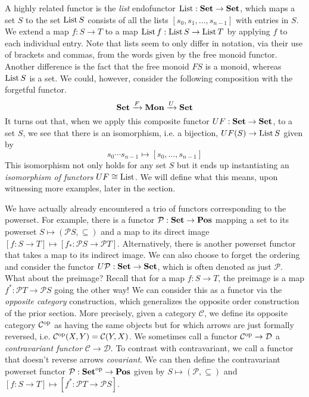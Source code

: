 A highly related functor is the \emph{list} endofunctor $\operatorname{List}:\mathbf{Set}\to\mathbf{Set}$, which maps a set $S$ to the set $\operatorname{List} S $ consists of all the lists $[s_0,s_1,\dots,s_{n-1}]$ with entries in $S$. We extend a map $f:S\to T$ to a map $\operatorname{List} f:\operatorname{List} S\to\operatorname{List} T$ by applying $f$ to each individual entry. Note that lists seem to only differ in notation, via their use of brackets and commas, from the words given by the free monoid functor. Another difference is the fact that the free monoid $FS$ is a monoid, whereas $\operatorname{List} S$ is a set. We could, however, consider the following composition with the forgetful functor.
\[\mathbf{Set}\xrightarrow{F}\mathbf{Mon}\xrightarrow{U}\mathbf{Set}\]
It turns out that, when we apply this composite functor $UF:\mathbf{Set}\to\mathbf{Set}$, to a set $S$, we see that there is an isomorphism, i.e. a bijection, $UF(S)\to\operatorname{List} S$ given by
\[s_0\cdots s_{n-1}\mapsto [s_0,\dots,s_{n-1}]\]
This isomorphism not only holds for any set $S$ but it ends up instantiating an \emph{isomorphism of functors} $UF\cong\operatorname{List}$. We will define what this means, upon witnessing more examples, later in the section.

We have actually already encountered a trio of functors corresponding to the powerset. For example, there is a functor $\mathcal{P}:\mathbf{Set}\to\mathbf{Pos}$ mapping a set to its powerset $S\mapsto(\mathcal{P}S,\subseteq)$ and a map to its direct image $[f:S\to T]\mapsto [f_*:\mathcal{P}S\to\mathcal{P}T]$. Alternatively, there is another powerset functor that takes a map to its indirect image. We can also choose to forget the ordering and consider the functor $U\mathcal{P}:\mathbf{Set}\to\mathbf{Set}$, which is often denoted as just $\mathcal{P}$. What about the preimage? Recall that for a map $f:S\to T$, the preimage is a map $f^*:\mathcal{P}T\to\mathcal{P}S$ going the other way! We can consider this as a functor via the \emph{opposite category} construction, which generalizes the opposite order construction of the prior section. More precisely, given a category $\mathcal{C}$, we define its opposite category $\mathcal{C}^{\text{op}}$ as having the same objects but for which arrows are just formally reversed, i.e. $\mathcal{C}^{\text{op}}(X,Y)=\mathcal{C}(Y,X)$. We sometimes call a functor $\mathcal{C}^{\text{op}}\to\mathcal{D}$ a \emph{contravariant functor} $\mathcal{C}\to\mathcal{D}$. To contrast with contravariant, we call a functor that doesn't reverse arrows \emph{covariant}. We can then define the contravariant powerset functor $\mathcal{P}:\mathbf{Set}^{\text{op}}\to\mathbf{Pos}$ given by $S\mapsto (\mathcal{P},\subseteq)$ and $[f:S\to T]\mapsto [f^*:\mathcal{P}T\to\mathcal{P}S]$.

